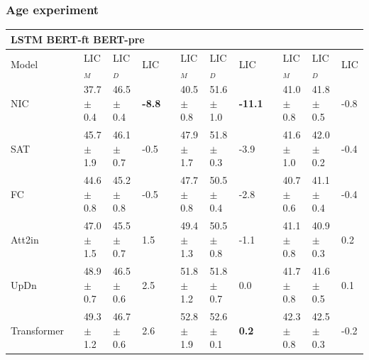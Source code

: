 \subsubsection{Age experiment}
 \begin{table}[ht]
     \begin{adjustbox}{width=\columnwidth,center}
  \begin{tabular}{@{}lllllllllllll@{}}
    \toprule
    \multicolumn{13}{l}{\hspace{4.5cm}LSTM \hspace{4cm}BERT-ft \hspace{4cm}BERT-pre} 
       \\ \midrule
       
 Model &  & LIC$_{M}$ & LIC$_{D}$ &  LIC &  & LIC$_{M}$ & LIC$_{D}$ &  LIC &   & LIC$_{M}$ & LIC$_{D}$ &  LIC   \\ \midrule 


NIC           &  & 37.7 $\pm$ 0.4  & 46.5 $\pm$ 0.4 & \color[HTML]{32CB00} \textbf{-8.8}   &  & 40.5 $\pm$ 0.8  & 51.6 $\pm$ 1.0 & \color[HTML]{32CB00} \textbf{-11.1} &  & 41.0 $\pm$ 0.8  & 41.8 $\pm$ 0.5 & -0.8 \\ 

SAT          &  & 45.7 $\pm$ 1.9  & 46.1 $\pm$ 0.7 & -0.5 &  & 47.9 $\pm$ 1.7  & 51.8 $\pm$ 0.3 & -3.9  &  & 41.6 $\pm$ 1.0  & 42.0 $\pm$ 0.2 & -0.4  \\ 

 FC           &  & 44.6 $\pm$ 0.8  & 45.2 $\pm$ 0.8 & -0.5  &  & 47.7 $\pm$ 0.8  & 50.5 $\pm$ 0.4 & -2.8   &  & 40.7 $\pm$ 0.6  & 41.1 $\pm$ 0.4 & -0.4 \\
 
 Att2in           &  & 47.0 $\pm$ 1.5  & 45.5 $\pm$ 0.7 & 1.5 &  & 49.4 $\pm$ 1.3  & 50.5 $\pm$ 0.8 & -1.1  &  & 41.1 $\pm$ 0.8  & 40.9 $\pm$ 0.3 & 0.2 \\ 
 
 UpDn           &  & 48.9 $\pm$ 0.7  & 46.5 $\pm$ 0.6 & 2.5 &  & 51.8 $\pm$ 1.2  & 51.8 $\pm$ 0.7 & 0.0 &  & 41.7 $\pm$ 0.8  & 41.6 $\pm$ 0.5 & 0.1\\ 
 
 Transformer           &  & 49.3 $\pm$ 1.2  & 46.7 $\pm$ 0.6 & 2.6  &  & 52.8 $\pm$ 1.9  & 52.6 $\pm$ 0.1 &  \color[HTML]{CB0000} \textbf{0.2}  &  & 42.3 $\pm$ 0.8  & 42.5 $\pm$ 0.3 & -0.2  \\ 
 

\end{tabular}
\end{adjustbox}
\end{table}
